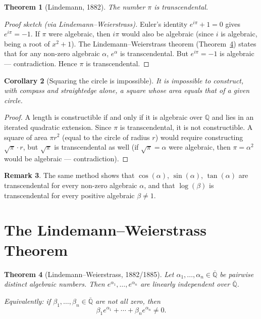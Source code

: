 \documentclass[12pt,a4paper]{amsart}
\newtheorem{theorem}{Theorem}[section]
\newtheorem{corollary}[theorem]{Corollary}
\theoremstyle{definition}
\newtheorem{remark}[theorem]{Remark}
\begin{document}
\begin{theorem}[Lindemann, 1882]
\label{thm:pi-transcendental}
The number $\pi$ is transcendental.
\end{theorem}

\begin{proof}[Proof sketch (via Lindemann--Weierstrass)]
Euler's identity $e^{i\pi} + 1 = 0$ gives $e^{i\pi} = -1$.
If $\pi$ were algebraic, then $i\pi$ would also be algebraic (since $i$ is
algebraic, being a root of $x^2 + 1$). The Lindemann--Weierstrass theorem
(Theorem~\ref{thm:lw}) states that for any non-zero algebraic $\alpha$,
$e^\alpha$ is transcendental. But $e^{i\pi} = -1$ is algebraic — contradiction.
Hence $\pi$ is transcendental.
\end{proof}

\begin{corollary}[Squaring the circle is impossible]
It is impossible to construct, with compass and straightedge alone, a square
whose area equals that of a given circle.
\end{corollary}
\begin{proof}
A length is constructible if and only if it is algebraic over $\mathbb{Q}$
and lies in an iterated quadratic extension. Since $\pi$ is transcendental, it
is not constructible. A square of area $\pi r^2$ (equal to the circle of radius
$r$) would require constructing $\sqrt{\pi} \cdot r$, but $\sqrt{\pi}$ is
transcendental as well (if $\sqrt{\pi} = \alpha$ were algebraic, then
$\pi = \alpha^2$ would be algebraic — contradiction).
\end{proof}

\begin{remark}
The same method shows that $\cos(\alpha)$, $\sin(\alpha)$, $\tan(\alpha)$
are transcendental for every non-zero algebraic $\alpha$, and that
$\log(\beta)$ is transcendental for every positive algebraic $\beta \neq 1$.
\end{remark}


\section{The Lindemann--Weierstrass Theorem}
\label{sec:lw}

\begin{theorem}[Lindemann--Weierstrass, 1882/1885]
\label{thm:lw}
Let $\alpha_1, \ldots, \alpha_n \in \overline{\mathbb{Q}}$ be pairwise
distinct algebraic numbers. Then $e^{\alpha_1}, \ldots, e^{\alpha_n}$ are
linearly independent over $\overline{\mathbb{Q}}$.

Equivalently: if $\beta_1, \ldots, \beta_n \in \overline{\mathbb{Q}}$ are
not all zero, then
\[
  \beta_1 e^{\alpha_1} + \cdots + \beta_n e^{\alpha_n} \neq 0.
\]
\end{theorem}
\end{document}
